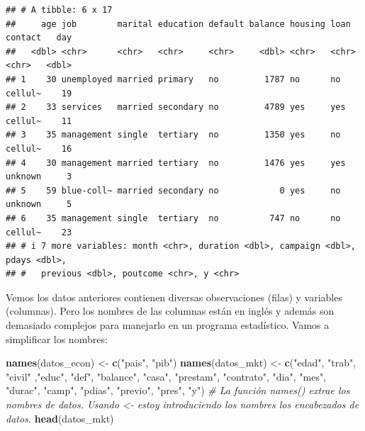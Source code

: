 \documentclass[
]{book}
\newenvironment{Shaded}{\begin{snugshade}}{\end{snugshade}}
\newcommand{\CommentTok}[1]{\textcolor[rgb]{0.56,0.35,0.01}{\textit{#1}}}
\newcommand{\FunctionTok}[1]{\textcolor[rgb]{0.13,0.29,0.53}{\textbf{#1}}}
\newcommand{\NormalTok}[1]{#1}
\newcommand{\OtherTok}[1]{\textcolor[rgb]{0.56,0.35,0.01}{#1}}
\newcommand{\StringTok}[1]{\textcolor[rgb]{0.31,0.60,0.02}{#1}}
\begin{document}
\begin{verbatim}
## # A tibble: 6 x 17
##     age job        marital education default balance housing loan  contact   day
##   <dbl> <chr>      <chr>   <chr>     <chr>     <dbl> <chr>   <chr> <chr>   <dbl>
## 1    30 unemployed married primary   no         1787 no      no    cellul~    19
## 2    33 services   married secondary no         4789 yes     yes   cellul~    11
## 3    35 management single  tertiary  no         1350 yes     no    cellul~    16
## 4    30 management married tertiary  no         1476 yes     yes   unknown     3
## 5    59 blue-coll~ married secondary no            0 yes     no    unknown     5
## 6    35 management single  tertiary  no          747 no      no    cellul~    23
## # i 7 more variables: month <chr>, duration <dbl>, campaign <dbl>, pdays <dbl>,
## #   previous <dbl>, poutcome <chr>, y <chr>
\end{verbatim}

Vemos los datos anteriores contienen diversas observaciones (filas) y variables (columnas). Pero los nombres de las columnas están en inglés y además son demasiado complejos para manejarlo en un programa estadístico. Vamos a simplificar los nombres:

\begin{Shaded}
\begin{Highlighting}[]
\FunctionTok{names}\NormalTok{(datos\_econ) }\OtherTok{\textless{}{-}} \FunctionTok{c}\NormalTok{(}\StringTok{"pais"}\NormalTok{, }\StringTok{"pib"}\NormalTok{)}
\FunctionTok{names}\NormalTok{(datos\_mkt) }\OtherTok{\textless{}{-}} \FunctionTok{c}\NormalTok{(}\StringTok{"edad"}\NormalTok{, }\StringTok{"trab"}\NormalTok{, }\StringTok{"civil"}\NormalTok{ ,}\StringTok{"educ"}\NormalTok{, }\StringTok{"def"}\NormalTok{, }\StringTok{"balance"}\NormalTok{, }\StringTok{"casa"}\NormalTok{, }\StringTok{"prestam"}\NormalTok{, }\StringTok{"contrato"}\NormalTok{, }\StringTok{"dia"}\NormalTok{, }\StringTok{"mes"}\NormalTok{, }\StringTok{"durac"}\NormalTok{, }\StringTok{"camp"}\NormalTok{, }\StringTok{"pdias"}\NormalTok{, }\StringTok{"previo"}\NormalTok{, }\StringTok{"pres"}\NormalTok{, }\StringTok{"y"}\NormalTok{)}
\CommentTok{\# La función names() extrae los nombres de \textquotesingle{}datos\textquotesingle{}. Usando \textless{}{-} estoy introduciendo los nombres los encabezados de \textquotesingle{}datos\textquotesingle{}.}
\FunctionTok{head}\NormalTok{(datos\_mkt)}
\end{Highlighting}
\end{Shaded}
\end{document}

